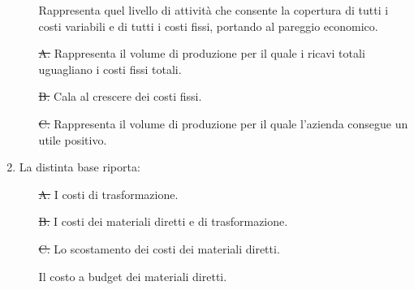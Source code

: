 \documentclass{article}
\begin{document}
\begin{enumerate}
          \begin{itemize}
              \item[\checkmark] Rappresenta quel livello di attività che consente la copertura di tutti i costi variabili e di tutti i costi fissi, portando al pareggio economico.
              \item[\sout{A.}] Rappresenta il volume di produzione per il quale i ricavi totali uguagliano i costi fissi totali.
              \item[\sout{B.}] Cala al crescere dei costi fissi.
              \item[\sout{C.}] Rappresenta il volume di produzione per il quale l'azienda consegue un utile positivo.
          \end{itemize}
    \item La distinta base riporta:
          \begin{itemize}
              \item[\sout{A.}] I costi di trasformazione.
              \item[\sout{B.}] I costi dei materiali diretti e di trasformazione.
              \item[\sout{C.}] Lo scostamento dei costi dei materiali diretti.
              \item[\checkmark] Il costo a budget dei materiali diretti.
          \end{itemize}
\end{enumerate}
\end{document}
